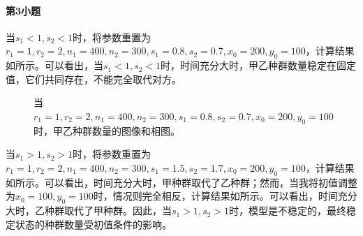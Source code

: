\documentclass[12pt,a4paper]{article}
\begin{document}
\paragraph{第3小题} 当$s_1<1,s_2<1$时，将参数重置为$r_1=1,r_2=2,n_1=400,n_2=300,s_1=0.8,s_2=0.7,x_0=200,y_0=100$，计算结果如所示。可以看出，当$s_1<1,s_2<1$时，时间充分大时，甲乙种群数量稳定在固定值，它们共同存在，不能完全取代对方。

\begin{figure}[t]
    \centering
    \caption{当$r_1=1,r_2=2,n_1=400,n_2=300,s_1=0.8,s_2=0.7,x_0=200,y_0=100$时，甲乙种群数量的图像和相图。}
    \label{fig:ex9_sub3_bigy}
\end{figure}

当$s_1>1,s_2>1$时，将参数重置为$r_1=1,r_2=2,n_1=400,n_2=300,s_1=1.5,s_2=1.7,x_0=200,y_0=100$，计算结果如所示。可以看出，时间充分大时，甲种群取代了乙种群；然而，当我将初值调整为$x_0=100,y_0=100$时，情况则完全相反，计算结果如所示。可以看出，时间充分大时，乙种群取代了甲种群。因此，当$s_1>1,s_2>1$时，模型是不稳定的，最终稳定状态的种群数量受初值条件的影响。
\end{document}

